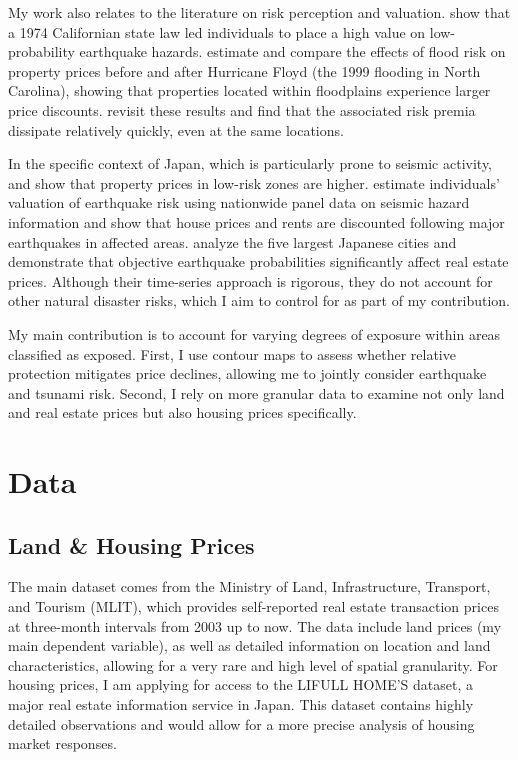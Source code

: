 \documentclass{article}
\begin{document}
My work also relates to the literature on risk perception and valuation. \cite{brookshire_test_1985} show that a 1974 Californian state law led individuals to place a high value on low-probability earthquake hazards. \cite{bin_effects_2004} estimate and compare the effects of flood risk on property prices before and after Hurricane Floyd (the 1999 flooding in North Carolina), showing that properties located within floodplains experience larger price discounts. \cite{bin_premium_2013} revisit these results and find that the associated risk premia dissipate relatively quickly, even at the same locations.

In the specific context of Japan, which is particularly prone to seismic activity, \cite{nakagawa_impact_2010} and \cite{hidano_effect_2015} show that property prices in low-risk zones are higher. \cite{naoi_earthquake_2009} estimate individuals’ valuation of earthquake risk using nationwide panel data on seismic hazard information and show that house prices and rents are discounted following major earthquakes in affected areas. \cite{ikefuji_earthquake_2022} analyze the five largest Japanese cities and demonstrate that objective earthquake probabilities significantly affect real estate prices. Although their time-series approach is rigorous, they do not account for other natural disaster risks, which I aim to control for as part of my contribution.

My main contribution is to account for varying degrees of exposure within areas classified as exposed. First, I use contour maps to assess whether relative protection mitigates price declines, allowing me to jointly consider earthquake and tsunami risk. Second, I rely on more granular data to examine not only land and real estate prices but also housing prices specifically.


\section{Data}

\subsection{Land \& Housing Prices}

The main dataset comes from the Ministry of Land, Infrastructure, Transport, and Tourism (MLIT), which provides self-reported real estate transaction prices at three-month intervals from 2003 up to now. The data include land prices (my main dependent variable), as well as detailed information on location and land characteristics, allowing for a very rare and high level of spatial granularity. For housing prices, I am applying for access to the LIFULL HOME’S dataset, a major real estate information service in Japan. This dataset contains highly detailed observations and would allow for a more precise analysis of housing market responses.
\end{document}
